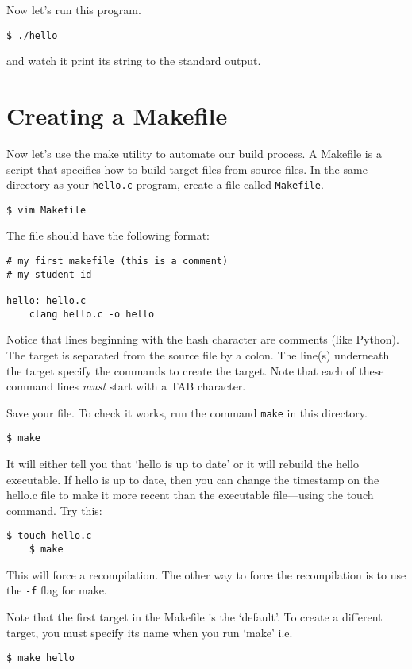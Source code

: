 \documentclass{article}
\begin{document}
Now let's run this program. 
\begin{lstlisting}[style=BashInputStyle]
    $ ./hello
\end{lstlisting}
and watch it print its string to the standard output.



\section*{Creating a Makefile}

Now let's use the make utility to automate our build process. A Makefile is a script that specifies how to build target files from source files.
In the same directory as your \texttt{hello.c} program, create a file called \texttt{Makefile}.
\begin{lstlisting}[style=BashInputStyle]
    $ vim Makefile
\end{lstlisting}

The file should have the following format:
\begin{lstlisting}[style=MakeProg]
# my first makefile (this is a comment)
# my student id 

hello: hello.c
    clang hello.c -o hello
\end{lstlisting}

Notice that lines beginning with the hash character are comments (like Python).
The target is separated from the source file by a colon. 
The line(s) underneath the target specify the commands to create the target. Note that each of these command lines \textit{must} start with a TAB character.

Save your file. To check it works, run the command \texttt{make} in this directory.
\begin{lstlisting}[style=BashInputStyle]
    $ make
\end{lstlisting}

It will either tell you that `hello is up to date' or it will rebuild the hello executable. If hello is up to date, then you can change the timestamp on the hello.c file to make it more recent than the executable file---using the touch command. Try this:
\begin{lstlisting}[style=BashInputStyle]
    $ touch hello.c
    $ make
\end{lstlisting}

This will force a recompilation. The other way to force the recompilation is to use the \texttt{-f} flag for make. 

Note that the first target in the Makefile is the `default'. To create a different target, you must specify its name when you run `make' i.e.
\begin{lstlisting}[style=BashInputStyle]
    $ make hello
\end{lstlisting}
\end{document}
